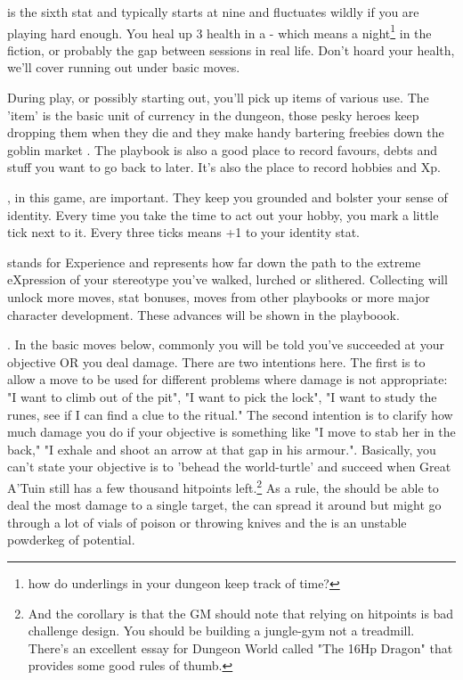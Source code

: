 \documentclass{tufte-book}
\begin{document}
 is the sixth stat and typically starts at nine and fluctuates wildly if you are playing hard enough. You heal up 3 health in a  - which means a night\footnote{how do underlings in your dungeon keep track of time?} in the fiction, or probably the gap between sessions in real life. Don't hoard your health, we'll cover running out under basic moves. 

During play, or possibly starting out, you'll pick up items of various use. The 'item' is the basic unit of currency in the dungeon, those pesky heroes keep dropping them when they die and they make handy bartering freebies down the goblin market .  The playbook is also a good place to record favours, debts and stuff you want to go back to later. It's also the place to record hobbies and Xp. 

, in this game, are important. They keep you grounded and bolster your sense of identity. Every time you take the time to act out your hobby, you mark a little tick next to it. Every three ticks means +1 to your identity stat.  

 stands for Experience and represents  how far down the path to the extreme eXpression of your stereotype you've walked, lurched or slithered. Collecting  will unlock more moves, stat bonuses, moves from other playbooks or more major character development. These advances will be shown in the playboook.

 . In the basic moves below, commonly you will be told you've succeeded at your objective OR you deal damage. There are two intentions here. The first is to allow a move to be used for different problems where damage is not appropriate: "I want to climb out of the pit", "I want to pick the lock", "I want to study the runes, see if I can find a clue to the ritual." The second intention is to clarify how much damage you do if your objective is something like "I move to stab her in the back," "I exhale and shoot an arrow at that gap in his armour.". Basically, you can't state your objective is to 'behead the world-turtle' and succeed when Great A'Tuin still has a few thousand hitpoints left.\footnote{And the corollary is that the GM should note that relying on hitpoints is bad challenge design. You should be building a jungle-gym not a treadmill. There's an excellent essay for Dungeon World called "The 16Hp Dragon" that provides some good rules of thumb.} As a rule, the  should be able to deal the most damage to a single target, the  can spread it around but might go through a lot of vials of poison or throwing knives and the  is an unstable powderkeg of potential.
\bigskip
\end{document}
